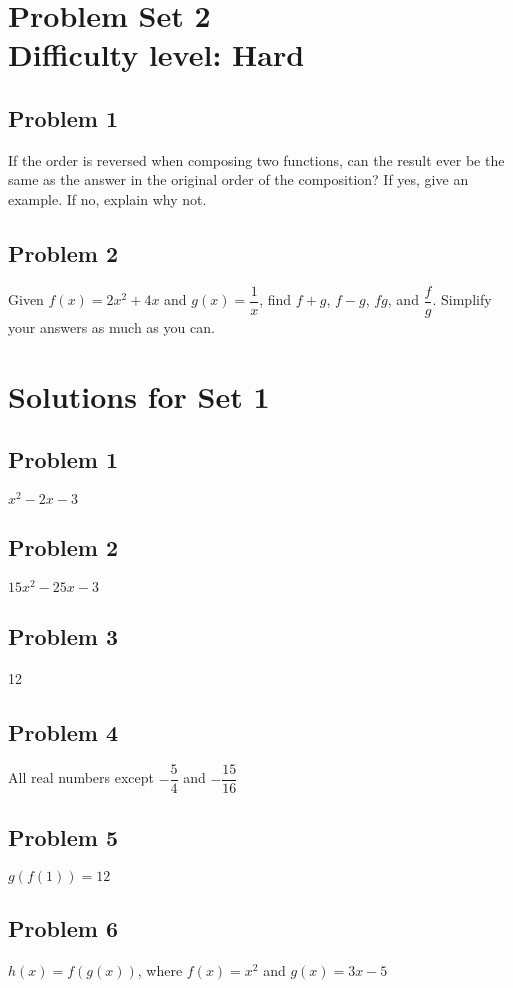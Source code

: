 \documentclass[12pt]{article}
\begin{document}
\section*{Problem Set 2\\Difficulty level: Hard}
\subsection*{Problem 1}
If the order is reversed when composing two functions, can the result ever be the same as the answer in the original order of the composition? If yes, give an example. If no, explain why not.

\subsection*{Problem 2}
Given \( f(x) = 2x^2 + 4x \) and \( g(x) = \dfrac{1}{x} \), find \( f + g \), \( f - g \), \( fg \), and \( \dfrac{f}{g} \). Simplify your answers as much as you can.

\newpage
\section*{Solutions for Set 1}
\subsection*{Problem 1}
\( x^2 - 2x - 3 \)

\subsection*{Problem 2}
\( 15x^2 - 25x - 3 \)

\subsection*{Problem 3}
12

\subsection*{Problem 4}
All real numbers except \(-\dfrac{5}{4}\) and \(-\dfrac{15}{16}\)

\subsection*{Problem 5}
\(g(f(1))=12\)

\subsection*{Problem 6}
\(h(x)=f(g(x))\), where \(f(x)=x^2\) and \(g(x)=3x-5\)
\end{document}
